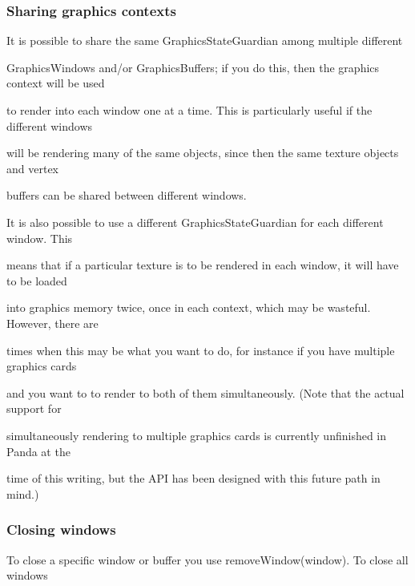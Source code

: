 \documentclass[a4paper]{article}
\begin{document}
\subsubsection[Sharing graphics contexts]{Sharing graphics contexts}
\hypertarget{RefHeading3857869075401}{}
\bigskip

{\color{black}
It is possible to share the same GraphicsStateGuardian among multiple different}

{\color{black}
GraphicsWindows and/or GraphicsBuffers; if you do this, then the graphics context will be used}

{\color{black}
to render into each window one at a time. This is particularly useful if the different windows}

{\color{black}
will be rendering many of the same objects, since then the same texture objects and vertex}

{\color{black}
buffers can be shared between different windows.}

{\color{black}
It is also possible to use a different GraphicsStateGuardian for each different window. This}

{\color{black}
means that if a particular texture is to be rendered in each window, it will have to be loaded}

{\color{black}
into graphics memory twice, once in each context, which may be wasteful. However, there are}

{\color{black}
times when this may be what you want to do, for instance if you have multiple graphics cards}

{\color{black}
and you want to to render to both of them simultaneously. (Note that the actual support for}

{\color{black}
simultaneously rendering to multiple graphics cards is currently unfinished in Panda at the}

{\color{black}
time of this writing, but the API has been designed with this future path in mind.)}


\bigskip

\subsubsection[Closing windows]{Closing windows}
\hypertarget{RefHeading3859869075401}{}
\bigskip

{\color{black}
To close a specific window or buffer you use removeWindow(window). To close all windows}


\bigskip
\end{document}
